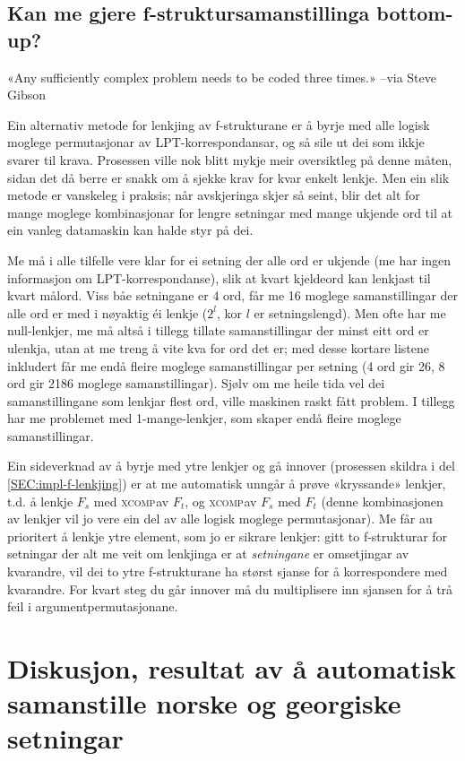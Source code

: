 \documentclass[11pt,a4paper,oneside,draft]{book}
\newcommand{\F}[2]{\textsc{#1}\ensuremath{_{#2}}}
\newcommand{\XCOMP}{\F{xcomp}{}}
\begin{document}
\section{Kan me gjere f-struktursamanstillinga bottom-up?}
\label{sec-4.6}

   «Any sufficiently complex problem needs to be coded three times.»
   --via Steve Gibson

Ein alternativ metode for lenkjing av f-strukturane er å byrje med
alle logisk moglege permutasjonar av LPT-korrespondansar, og så sile
ut dei som ikkje svarer til krava. Prosessen ville nok blitt mykje
meir oversiktleg på denne måten, sidan det då berre er snakk om å
sjekke krav for kvar enkelt lenkje.  Men ein slik metode er vanskeleg
i praksis; når avskjeringa skjer så seint, blir det alt for mange
moglege kombinasjonar for lengre setningar med mange ukjende ord til
at ein vanleg datamaskin kan halde styr på dei.

Me må i alle tilfelle vere klar for ei setning der alle ord er ukjende
(me har ingen informasjon om LPT-korrespondanse), slik at kvart
kjeldeord kan lenkjast til kvart målord. Viss båe setningane er 4 ord,
får me 16 moglege samanstillingar der alle ord er med i nøyaktig éi
lenkje ($2^l$, kor $l$ er setningslengd). Men ofte har me
null-lenkjer, me må altså i tillegg tillate samanstillingar der minst
eitt ord er ulenkja, utan at me treng å vite kva for ord det er; med
desse kortare listene inkludert får me endå fleire moglege
samanstillingar per setning (4 ord gir 26, 8 ord gir 2186 moglege
samanstillingar). Sjølv om me heile tida vel dei samanstillingane som
lenkjar flest ord, ville maskinen raskt fått problem. I tillegg har me
problemet med 1-mange-lenkjer, som skaper endå fleire moglege
samanstillingar.

Ein sideverknad av å byrje med ytre lenkjer og gå innover (prosessen
skildra i del \ref{SEC:impl-f-lenkjing}) er at me automatisk unngår å
prøve «kryssande» lenkjer, t.d. å lenkje $F_s$ med \XCOMP av $F_t$, og
\XCOMP av $F_s$ med $F_t$ (denne kombinasjonen av lenkjer vil jo vere
ein del av alle logisk moglege permutasjonar). Me får au prioritert å
lenkje ytre element, som jo er sikrare lenkjer: gitt to f-strukturar
for setningar der alt me veit om lenkjinga er at \emph{setningane} er
omsetjingar av kvarandre, vil dei to ytre f-strukturane ha størst
sjanse for å korrespondere med kvarandre. For kvart steg du går
innover må du multiplisere inn sjansen for å trå feil i
argumentpermutasjonane.


\chapter{Diskusjon, resultat av å automatisk samanstille norske og georgiske setningar}
\label{sec-5}
\end{document}
